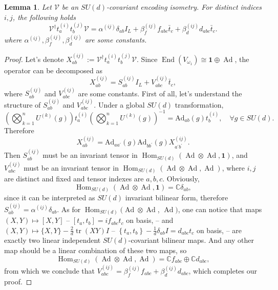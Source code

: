 \documentclass[10pt,twocolumn,superscriptaddress,aps,amsmath,amssymb,citeautoscript,floatfix,prx]{revtex4-2}
\theoremstyle{plain}
\theoremstyle{plain}
\theoremstyle{plain}
\theoremstyle{plain}
\theoremstyle{plain}
\theoremstyle{plain}
\theoremstyle{plain}
\newtheorem{smlemma}[smtheorem]{Lemma}
\theoremstyle{definition}
\theoremstyle{plain}
\begin{document}
\begin{appendix}
\begin{smlemma}\label{lem:2-body_action}
Let $\mathcal{V}$ be an $SU(d)$-covariant encoding isometry. For distinct indices $i, j$, the following holds
\[
    \mathcal{V}^{\dagger} t_a^{(i)} t_b^{(j)} \mathcal{V}=\alpha^{(i j)} \delta_{a b} I_L+\beta^{(i j)}_{f} f_{abc} \bar{t}_c+\beta^{(i j)}_{d} d_{abc} \bar{t}_c .
\]
where $\alpha^{(i j)}, \beta^{(i j)}_{f}, \beta^{(i j)}_{d}$ are some constants.
\end{smlemma}
\begin{proof}
    Let's denote $X_{a b}^{(i j)}:=\mathcal{V}^{\dagger} t_a^{(i)} t_b^{(j)} \mathcal{V}$. Since $\operatorname{End}\left(V_{\omega_1}\right) \cong \mathbf{1} \oplus \operatorname{Ad}$,
    the operator can be decomposed as
    \[
        X_{a b}^{(i j)}=S_{a b}^{(i j)} I_L+V_{abc}^{(i j)} \bar{t}_c,
    \]
    where $S_{a b}^{(i j)}$ and $V_{abc}^{(i j)}$ are some constants.
    First of all, let's understand the structure of $S_{a b}^{(i j)}$ and $V_{abc}^{(i j)}$. 
    Under a global $SU(d)$ transformation,
    $$
    \left(\bigotimes_{k=1}^n U^{(k)}(g)\right) t_a^{(i)} \left(\bigotimes_{k=1}^n U^{(k)}(g)\right)^{-1}=\mathrm{Ad}_{ab}(g) t_b^{(i)}, \quad \forall g \in SU(d).
    $$
    Therefore
    $$
    X_{a b}^{(i j)}=\mathrm{Ad}_{a a^{\prime}}(g) \mathrm{Ad}_{b b^{\prime}}(g) X_{a^{\prime} b^{\prime}}^{(i j)} .
    $$
    Then $S_{ab}^{(i j)}$ must be an invariant tensor in $\operatorname{Hom}_{SU(d)}(\operatorname{Ad} \otimes \operatorname{Ad}, \mathbf{1})$, and
    $V_{abc}^{(i j)}$ must be an invariant tensor in $\operatorname{Hom}_{SU(d)}(\operatorname{Ad} \otimes \operatorname{Ad}, \operatorname{Ad})$, where $i, j$ are distinct and fixed and tensor indexes are $a, b, c$.
    Obviously, 
    $$
    \operatorname{Hom}_{S U(d)}(\operatorname{Ad} \otimes \operatorname{Ad}, \mathbf{1})=\mathbb{C} \delta_{a b},
    $$
    since it can be interpreted as $SU(d)$ invariant bilinear form, therefore $S_{a b}^{(i j)}=\alpha^{(i j)}\delta_{ab}$. 
    As for $\operatorname{Hom}_{SU(d)}(\operatorname{Ad} \otimes \operatorname{Ad}$, $\operatorname{Ad})$, one can notice that maps $(X, Y) \mapsto[X, Y]$ -- $\left[t_a, t_b\right]=i f_{abc} t_c$ on basis, -- and $(X, Y) \mapsto\{X, Y\}-\frac{2}{d} \operatorname{tr}(X Y) I$ -- 
    $\left\{t_a, t_b\right\}-\frac{1}{d} \delta_{a b} I=d_{abc} t_c$ on basis, -- are exactly two linear independent $SU(d)$-covariant bilinear maps. And any other map should be a linear combination of these two maps,
    so 
    $$
    \operatorname{Hom}_{SU(d)}(\operatorname{Ad} \otimes \operatorname{Ad}, \operatorname{Ad})=\mathbb{C} f_{abc} \oplus \mathbb{C} d_{abc},
    $$ 
    from which we conclude that $V_{abc}^{(i j)}=\beta^{(i j)}_{f} f_{abc}+\beta^{(i j)}_{d} d_{abc}$, which completes our proof.
\end{proof}


\end{appendix}
\end{document}
